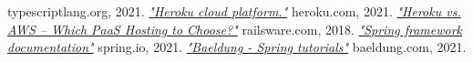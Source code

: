 \documentclass[twoside]{ctuthesis}
\begin{document}
\begin{thebibliography}{99}
        typescriptlang.org, 2021.
        \href{https://www.heroku.com/}{\emph{"Heroku cloud platform."}}
        heroku.com, 2021.
        \href{https://railsware.com/blog/heroku-vs-aws-which-paas-hosting-to-choose/}{\emph{"Heroku vs. AWS – Which PaaS Hosting to Choose?"}}
        railsware.com, 2018.
        \href{https://docs.spring.io/spring-framework/docs/current/reference/html/}{\emph{"Spring framework documentation"}}
        spring.io, 2021.
        \href{https://www.baeldung.com/}{\emph{"Baeldung - Spring tutorials"}}
        baeldung.com, 2021.
    \end{thebibliography}
\end{document}
